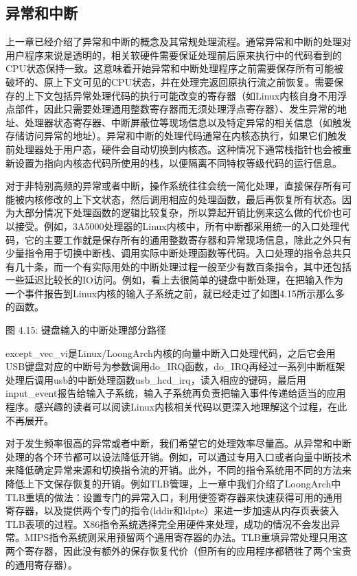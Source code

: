 \documentclass[]{ctexbook}
\begin{document}
\hypertarget{ux5f02ux5e38ux548cux4e2dux65ad}{%
\subsection{异常和中断}\label{ux5f02ux5e38ux548cux4e2dux65ad}}

上一章已经介绍了异常和中断的概念及其常规处理流程。通常异常和中断的处理对用户程序来说是透明的，相关软硬件需要保证处理前后原来执行中的代码看到的CPU状态保持一致。这意味着开始异常和中断处理程序之前需要保存所有可能被破坏的、原上下文可见的CPU状态，并在处理完返回原执行流之前恢复。需要保存的上下文包括异常处理代码的执行可能改变的寄存器（如Linux内核自身不用浮点部件，因此只需要处理通用整数寄存器而无须处理浮点寄存器）、发生异常的地址、处理器状态寄存器、中断屏蔽位等现场信息以及特定异常的相关信息（如触发存储访问异常的地址）。异常和中断的处理代码通常在内核态执行，如果它们触发前处理器处于用户态，硬件会自动切换到内核态。这种情况下通常栈指针也会被重新设置为指向内核态代码所使用的栈，以便隔离不同特权等级代码的运行信息。

对于非特别高频的异常或者中断，操作系统往往会统一简化处理，直接保存所有可能被内核修改的上下文状态，然后调用相应的处理函数，最后再恢复所有状态。因为大部分情况下处理函数的逻辑比较复杂，所以算起开销比例来这么做的代价也可以接受。例如，3A5000处理器的Linux内核中，所有中断都采用统一的入口处理代码，它的主要工作就是保存所有的通用整数寄存器和异常现场信息，除此之外只有少量指令用于切换中断栈、调用实际中断处理函数等代码。入口处理的指令总共只有几十条，而一个有实际用处的中断处理过程一般至少有数百条指令，其中还包括一些延迟比较长的IO访问。例如，看上去很简单的键盘中断处理，在把输入作为一个事件报告到Linux内核的输入子系统之前，就已经走过了如图4.15所示那么多的函数。

图 4.15: 键盘输入的中断处理部分路径

except\_vec\_vi是Linux/LoongArch内核的向量中断入口处理代码，之后它会用USB键盘对应的中断号为参数调用do\_IRQ函数，do\_IRQ再经过一系列中断框架处理后调用usb的中断处理函数usb\_hcd\_irq，读入相应的键码，最后用input\_event报告给输入子系统，输入子系统再负责把输入事件传递给适当的应用程序。感兴趣的读者可以阅读Linux内核相关代码以更深入地理解这个过程，在此不再展开。

对于发生频率很高的异常或者中断，我们希望它的处理效率尽量高。从异常和中断处理的各个环节都可以设法降低开销。例如，可以通过专用入口或者向量中断技术来降低确定异常来源和切换指令流的开销。此外，不同的指令系统用不同的方法来降低上下文保存恢复的开销。例如TLB管理，上一章中我们介绍了LoongArch中TLB重填的做法：设置专门的异常入口，利用便签寄存器来快速获得可用的通用寄存器，以及提供两个专门的指令(lddir和ldpte）来进一步加速从内存页表装入TLB表项的过程。X86指令系统选择完全用硬件来处理，成功的情况不会发出异常。MIPS指令系统则采用预留两个通用寄存器的办法。TLB重填异常处理只用这两个寄存器，因此没有额外的保存恢复代价（但所有的应用程序都牺牲了两个宝贵的通用寄存器）。
\end{document}
